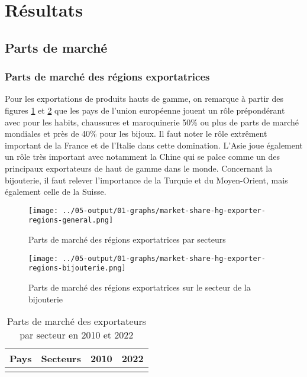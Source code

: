 \documentclass[french,10pt,a4paper]{article}
\begin{document}
\section{Résultats}

\subsection{Parts de marché}

\subsubsection{Parts de marché des régions exportatrices}

Pour les exportations de produits hauts de gamme, on remarque à partir des figures \ref{fig:market-share-hg-exporter-regions-general} et \ref{fig:market-share-hg-exporter-regions-bijouterie} que les pays de l'union européenne jouent un rôle prépondérant avec pour les habits, chaussures et maroquinerie 50\% ou plus de parts de marché mondiales et près de 40\% pour les bijoux. Il faut noter le rôle extrêment important de la France et de l'Italie dans cette domination. L'Asie joue également un rôle très important avec notamment la Chine qui se palce comme un des principaux exportateurs de haut de gamme dans le monde. Concernant la bijouterie, il faut relever l'importance de la Turquie et du Moyen-Orient, mais également celle de la Suisse. 

\begin{figure}[!h]
  \centering \texttt{[image: ../05-output/01-graphs/market-share-hg-exporter-regions-general.png]}
  \caption{Parts de marché des régions exportatrices par secteurs}
  \label{fig:market-share-hg-exporter-regions-general}
\end{figure}

\begin{figure}[!h]
  \centering \texttt{[image: ../05-output/01-graphs/market-share-hg-exporter-regions-bijouterie.png]}
  \caption{Parts de marché des régions exportatrices sur le secteur de la bijouterie}
  \label{fig:market-share-hg-exporter-regions-bijouterie}
\end{figure}

\begin{table}[ht]
  \centering
  \begin{tabular}{lrrr}
    \hline
   Pays & Secteurs & 2010 & 2022 \\
    \hline
    \\
    \hline
  \end{tabular}
  \caption{Parts de marché des exportateurs par secteur en 2010 et 2022}
  \label{tab:market-share-country-exporter}
\end{table}
\end{document}
